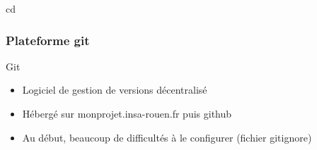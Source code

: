 cd 
\begin{frame}
    \frametitle{Plateforme git}
    		\begin{block}{Git}
    			\begin{itemize}
    				\item Logiciel de gestion de versions décentralisé
    				\item Hébergé sur monprojet.insa-rouen.fr puis github
    				\item Au début, beaucoup de difficultés à le configurer (fichier gitignore) 
    			\end{itemize}
    		\end{block}
  

\end{frame}